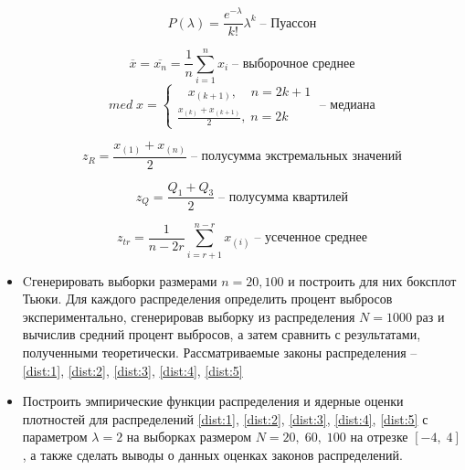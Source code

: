 \documentclass[12pt]{article}
\begin{document}
\begin{itemize}
{	\begin{equation}
	    P(\lambda) = \frac{e^{-\lambda}}{k!}\lambda^k \;\text{-- Пуассон} \label{dist:5}
	\end{equation}


	\begin{equation}
		\label{char:1}
		\overline{x} = \overline{x_n} = \frac{1}{n} \sum_{i=1}^{n}{x_i} \;\text{-- выборочное среднее}
	\end{equation}
	\begin{equation} 
		med \; x = 
	    \begin{cases}
	        \;\;\; x_{(k+1)}, \:\;\;\; n = 2k + 1 \\
	        \frac{x_{(k)} + x_{(k+1)}}{2}, \; n = 2k
	    \end{cases}
	    \;\text{-- медиана} \label{char:2}
	\end{equation}

	\begin{equation}
		\label{char:3}
		z_R = \frac{x_{(1)} + x_{(n)}}{2}  \;\text{-- полусумма экстремальных значений}
	\end{equation}

	\begin{equation}
		\label{char:4}
		z_Q = \frac{Q_1 + Q_3}{2}  \;\text{-- полусумма квартилей}
	\end{equation}

	\begin{equation}
		\label{char:5}
		z_{tr} = \frac{1}{n - 2r} \sum_{i = r + 1}^{n - r}{x_{(i)}}  \;\text{-- усеченное среднее}
	\end{equation}

	 }
	\item Cгенерировать выборки размерами $n = 20, 100$ и построить для них боксплот Тьюки. Для каждого распределения определить процент выбросов экспериментально, сгенерировав выборку из распределения $N =1000$ раз и вычислив средний процент выбросов, а затем сравнить с результатами, полученными теоретически. Рассматриваемые законы распределения – \eqref{dist:1}, \eqref{dist:2}, \eqref{dist:3}, \eqref{dist:4}, \eqref{dist:5}

	\item Построить эмпирические функции распределения и ядерные оценки плотностей для распределений \eqref{dist:1}, \eqref{dist:2}, \eqref{dist:3}, \eqref{dist:4}, \eqref{dist:5} с параметром $\lambda = 2$ на выборках размером $N = 20,\;60,\;100$ на отрезке $[-4,\;4]$, а также сделать выводы о данных оценках законов распределений. 
\end{itemize}
\indent{ }
\end{document}
